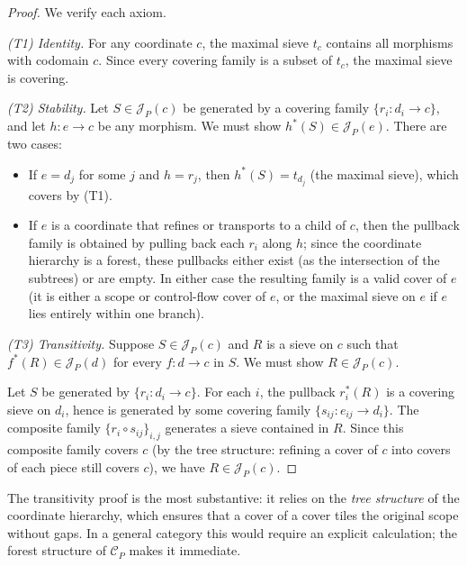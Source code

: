 \documentclass[11pt]{article}
\begin{document}
\begin{proof}
We verify each axiom.

\emph{(T1) Identity.}  For any coordinate $c$, the maximal sieve $t_c$
contains all morphisms with codomain $c$.  Since every covering family is a
subset of $t_c$, the maximal sieve is covering.

\emph{(T2) Stability.}  Let $S \in \mathscr{J}_P(c)$ be generated by a
covering family $\{r_i \colon d_i \to c\}$, and let $h \colon e \to c$ be any
morphism.  We must show $h^*(S) \in \mathscr{J}_P(e)$.  There are two cases:
\begin{itemize}[nosep]
  \item If $e = d_j$ for some $j$ and $h = r_j$, then $h^*(S) = t_{d_j}$
        (the maximal sieve), which covers by (T1).
  \item If $e$ is a coordinate that refines or transports to a child of $c$,
        then the pullback family is obtained by pulling back each $r_i$ along
        $h$; since the coordinate hierarchy is a forest, these pullbacks
        either exist (as the intersection of the subtrees) or are empty.  In
        either case the resulting family is a valid cover of $e$ (it is either
        a scope or control-flow cover of $e$, or the maximal sieve on $e$ if
        $e$ lies entirely within one branch).
\end{itemize}

\emph{(T3) Transitivity.}  Suppose $S \in \mathscr{J}_P(c)$ and $R$ is a
sieve on $c$ such that $f^*(R) \in \mathscr{J}_P(d)$ for every
$f \colon d \to c$ in $S$.  We must show $R \in \mathscr{J}_P(c)$.

Let $S$ be generated by $\{r_i \colon d_i \to c\}$.  For each $i$, the
pullback $r_i^*(R)$ is a covering sieve on $d_i$, hence is generated by some
covering family $\{s_{ij} \colon e_{ij} \to d_i\}$.  The composite
family $\{r_i \circ s_{ij}\}_{i,j}$ generates a sieve contained in $R$.
Since this composite family covers $c$ (by the tree structure: refining a
cover of $c$ into covers of each piece still covers $c$), we have
$R \in \mathscr{J}_P(c)$.
\end{proof}

The transitivity proof is the most substantive: it relies on the \emph{tree
structure} of the coordinate hierarchy, which ensures that a cover of a cover
tiles the original scope without gaps.  In a general category this would
require an explicit calculation; the forest structure of $\mathcal{C}_P$ makes
it immediate.

\end{document}
